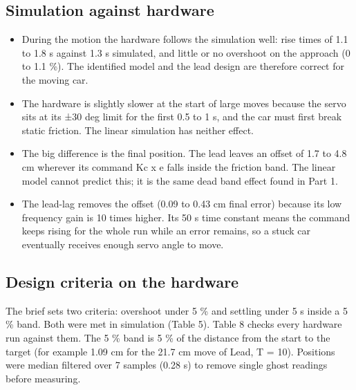 \documentclass[11pt,a4paper]{article}
\providecommand{\tightlist}{\setlength{\itemsep}{0pt}\setlength{\parskip}{0pt}}
\begin{document}
\hypertarget{simulation-against-hardware}{%
\subsection{Simulation against
hardware}\label{simulation-against-hardware}}

\begin{itemize}
\tightlist
\item
  During the motion the hardware follows the simulation well: rise times
  of 1.1 to 1.8 s against 1.3 s simulated, and little or no overshoot on
  the approach (0 to 1.1 \%). The identified model and the lead design
  are therefore correct for the moving car.
\item
  The hardware is slightly slower at the start of large moves because
  the servo sits at its ±30 deg limit for the first 0.5 to 1 s, and the
  car must first break static friction. The linear simulation has
  neither effect.
\item
  The big difference is the final position. The lead leaves an offset of
  1.7 to 4.8 cm wherever its command Kc x e falls inside the friction
  band. The linear model cannot predict this; it is the same dead band
  effect found in Part 1.
\item
  The lead-lag removes the offset (0.09 to 0.43 cm final error) because its low frequency gain is 10 times higher. Its 50 s time constant means the command keeps rising for the whole run while an error remains, so a stuck car eventually receives enough servo angle to move.
\end{itemize}

\hypertarget{design-criteria-on-the-hardware}{%
\subsection{Design criteria on the hardware}\label{design-criteria-on-the-hardware}}

The brief sets two criteria: overshoot under 5 \% and settling under 5 s inside a 5 \% band. Both were met in simulation (Table 5). Table 8 checks every hardware run against them. The 5 \% band is 5 \% of the distance from the start to the target (for example 1.09 cm for the 21.7 cm move of Lead, T = 10). Positions were median filtered over 7 samples (0.28 s) to remove single ghost readings before measuring.
\end{document}
